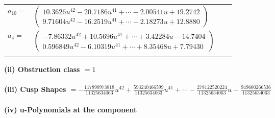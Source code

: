 \documentclass[1p]{elsarticle_modified}
\theoremstyle{definition}
\begin{document}
\begin{tabular}{m{7pt} m{180pt} m{7pt} m{180pt} }
\flushright $a_{10}=$&$\begin{pmatrix}10.3626 u^{42}-20.7186 u^{41}+\cdots-2.00541 u+19.2742\\9.71604 u^{42}-16.2519 u^{41}+\cdots-2.18273 u+12.8880\end{pmatrix}$ \\
\flushright $a_{4}=$&$\begin{pmatrix}-7.86332 u^{42}+10.5696 u^{41}+\cdots+3.42284 u-14.7404\\0.596849 u^{42}-6.10319 u^{41}+\cdots+8.35468 u+7.79430\end{pmatrix}$\\&\end{tabular}
\flushleft \textbf{(ii) Obstruction class $= 1$}\\~\\
\flushleft \textbf{(iii) Cusp Shapes $= -\frac{117890973818}{11325634063} u^{42}+\frac{593240466599}{11325634063} u^{41}+\cdots-\frac{278122520224}{11325634063} u-\frac{949600266536}{11325634063}$}\\~\\
\newpage\renewcommand{\arraystretch}{1}
\flushleft \textbf{(iv) u-Polynomials at the component}\newline \\
\end{document}
